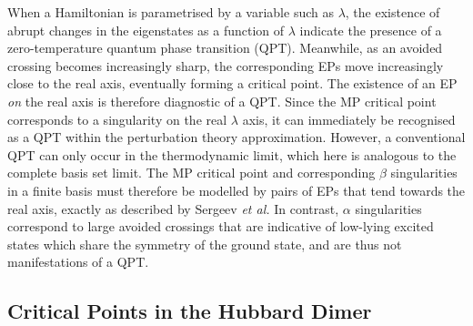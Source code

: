 \documentclass[aps,prb,reprint,noshowkeys,superscriptaddress]{revtex4-1}
\newcommand{\etal}{\textit{et al.}}
\begin{document}
When a Hamiltonian is parametrised by a variable such as $\lambda$, the existence of abrupt changes in the 
eigenstates as a function of $\lambda$ indicate the presence of a zero-temperature quantum phase transition (QPT).%
\cite{Heiss_1988,Heiss_2002,Borisov_2015,Sindelka_2017,CarrBook,Vojta_2003,SachdevBook,GilmoreBook} 
Meanwhile, as an avoided crossing becomes increasingly sharp, the corresponding EPs move increasingly close to the real axis, eventually forming a critical point.
The existence of an EP \emph{on} the real axis is therefore diagnostic of a QPT.\cite{Cejnar_2005, Cejnar_2007a}
Since the MP critical point corresponds to a singularity on the real $\lambda$ axis, it can immediately be
recognised as a QPT within the perturbation theory approximation.
However, a conventional QPT can only occur in the thermodynamic limit, which here is analogous to the complete 
basis set limit.\cite{Kais_2006}
The MP critical point and corresponding $\beta$ singularities in a finite basis must therefore be modelled by pairs of EPs
that tend towards the real axis, exactly as described by Sergeev \etal\cite{Sergeev_2005}
In contrast, $\alpha$ singularities correspond to large avoided crossings that are indicative of low-lying excited
states which share the symmetry of the ground state,\cite{Goodson_2004} and are thus not manifestations of a QPT.

\subsection{Critical Points in the Hubbard Dimer}
\label{sec:critical_point_hubbard}
\end{document}
